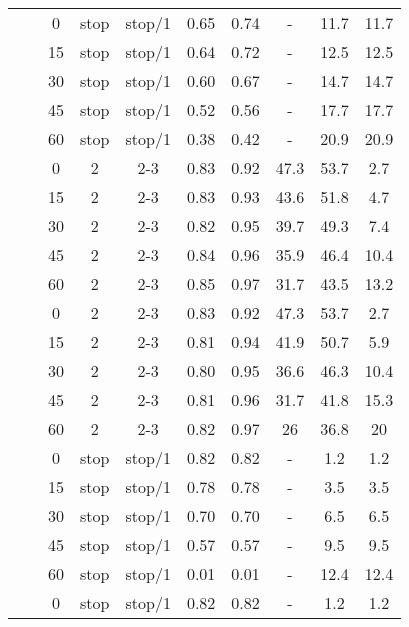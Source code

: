 \begin{longtable}[t]{cccccccccc}
	\nopagebreak
	&  & 0 & stop & stop/1 & 0.65 & 0.74 & - & 11.7 & 11.7\\
	\nopagebreak
	&  & 15 & stop & stop/1 & 0.64 & 0.72 & - & 12.5 & 12.5\\
	\nopagebreak
	&  & 30 & stop & stop/1 & 0.60 & 0.67 & - & 14.7 & 14.7\\
	\nopagebreak
	&  & 45 & stop & stop/1 & 0.52 & 0.56 & - & 17.7 & 17.7\\
	\nopagebreak
	\multirow{-10}{*}{\centering\arraybackslash 11} & \multirow{-5}{*}{\centering\arraybackslash 0.33} & 60 & stop & stop/1 & 0.38 & 0.42 & - & 20.9 & 20.9\\
	\cmidrule{1-10}\pagebreak[0]
	&  & 0 & 2 & 2-3 & 0.83 & 0.92 & 47.3 & 53.7 & 2.7\\
	\nopagebreak
	&  & 15 & 2 & 2-3 & 0.83 & 0.93 & 43.6 & 51.8 & 4.7\\
	\nopagebreak
	&  & 30 & 2 & 2-3 & 0.82 & 0.95 & 39.7 & 49.3 & 7.4\\
	\nopagebreak
	&  & 45 & 2 & 2-3 & 0.84 & 0.96 & 35.9 & 46.4 & 10.4\\
	\nopagebreak
	& \multirow{-5}{*}{\centering\arraybackslash 0.2} & 60 & 2 & 2-3 & 0.85 & 0.97 & 31.7 & 43.5 & 13.2\\
	\nopagebreak
	&  & 0 & 2 & 2-3 & 0.83 & 0.92 & 47.3 & 53.7 & 2.7\\
	\nopagebreak
	&  & 15 & 2 & 2-3 & 0.81 & 0.94 & 41.9 & 50.7 & 5.9\\
	\nopagebreak
	&  & 30 & 2 & 2-3 & 0.80 & 0.95 & 36.6 & 46.3 & 10.4\\
	\nopagebreak
	&  & 45 & 2 & 2-3 & 0.81 & 0.96 & 31.7 & 41.8 & 15.3\\
	\nopagebreak
	\multirow{-10}{*}{\centering\arraybackslash 12} & \multirow{-5}{*}{\centering\arraybackslash 0.33} & 60 & 2 & 2-3 & 0.82 & 0.97 & 26 & 36.8 & 20\\
	\cmidrule{1-10}\pagebreak[0]
	&  & 0 & stop & stop/1 & 0.82 & 0.82 & - & 1.2 & 1.2\\
	\nopagebreak
	&  & 15 & stop & stop/1 & 0.78 & 0.78 & - & 3.5 & 3.5\\
	\nopagebreak
	&  & 30 & stop & stop/1 & 0.70 & 0.70 & - & 6.5 & 6.5\\
	\nopagebreak
	&  & 45 & stop & stop/1 & 0.57 & 0.57 & - & 9.5 & 9.5\\
	\nopagebreak
	& \multirow{-5}{*}{\centering\arraybackslash 0.2} & 60 & stop & stop/1 & 0.01 & 0.01 & - & 12.4 & 12.4\\
	\nopagebreak
	&  & 0 & stop & stop/1 & 0.82 & 0.82 & - & 1.2 & 1.2\\

\end{longtable}
